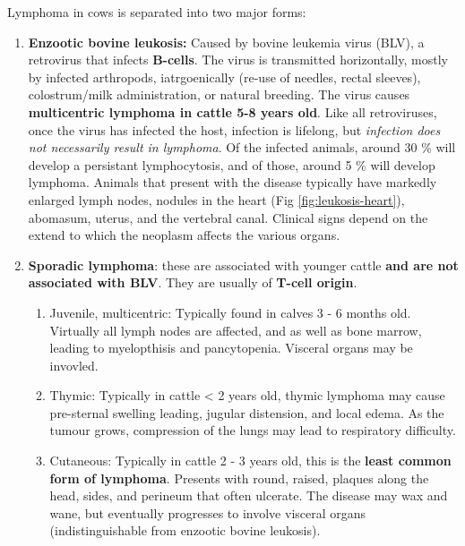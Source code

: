 \documentclass[openany]{article}
\providecommand{\tightlist}{%
  \setlength{\itemsep}{0pt}\setlength{\parskip}{0pt}}
\begin{document}
Lymphoma in cows is separated into two major forms:

\begin{enumerate}
\def\labelenumi{\arabic{enumi}.}
\tightlist
\item
  \textbf{Enzootic bovine leukosis:} Caused by bovine leukemia virus
  (BLV), a retrovirus that infects \textbf{B-cells}. The virus is
  transmitted horizontally, mostly by infected arthropods,
  iatrgoenically (re-use of needles, rectal sleeves), colostrum/milk
  administration, or natural breeding. The virus causes
  \textbf{multicentric lymphoma in cattle 5-8 years old}. Like all
  retroviruses, once the virus has infected the host, infection is
  lifelong, but \emph{infection does not necessarily result in
  lymphoma}. Of the infected animals, around 30 \% will develop a
  persistant lymphocytosis, and of those, around 5 \% will develop
  lymphoma. Animals that present with the disease typically have
  markedly enlarged lymph nodes, nodules in the heart (Fig
  \ref{fig:leukosis-heart}), abomasum, uterus, and the vertebral canal.
  Clinical signs depend on the extend to which the neoplasm affects the
  various organs.
\item
  \textbf{Sporadic lymphoma}: these are associated with younger cattle
  \textbf{and are not associated with BLV}. They are usually of
  \textbf{T-cell origin}.

  \begin{enumerate}
  \def\labelenumii{\roman{enumii})}
  \tightlist
  \item
    Juvenile, multicentric: Typically found in calves 3 - 6 months old.
    Virtually all lymph nodes are affected, and as well as bone marrow,
    leading to myelopthisis and pancytopenia. Visceral organs may be
    invovled.
  \item
    Thymic: Typically in cattle \textless{} 2 years old, thymic lymphoma
    may cause pre-sternal swelling leading, jugular distension, and
    local edema. As the tumour grows, compression of the lungs may lead
    to respiratory difficulty.
  \item
    Cutaneous: Typically in cattle 2 - 3 years old, this is the
    \textbf{least common form of lymphoma}. Presents with round, raised,
    plaques along the head, sides, and perineum that often ulcerate. The
    disease may wax and wane, but eventually progresses to involve
    visceral organs (indistinguishable from enzootic bovine leukosis).
  \end{enumerate}
\end{enumerate}
\end{document}
